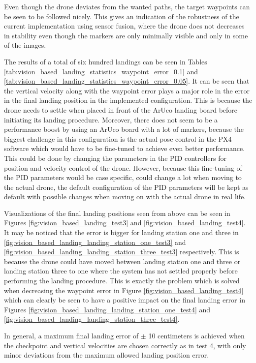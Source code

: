 \documentclass[../Head/report.tex]{subfiles}
\begin{document}
Even though the drone deviates from the wanted paths, the target waypoints can be seen to be followed nicely. This gives an indication of the robustness of the current implementation using sensor fusion, where the drone does not decreases in stability even though the markers are only minimally visible and only in some of the images. 

The results of a total of six hundred landings can be seen in Tables \ref{tab:vision_based_landing_statistics_waypoint_error_0.1} and \ref{tab:vision_based_landing_statistics_waypoint_error_0.05}. It can be seen that the vertical velocity along with the waypoint error plays a major role in the error in the final landing position in the implemented configuration. This is because the drone needs to settle when placed in front of the ArUco landing board before initiating its landing procedure. Moreover, there does not seem to be a performance boost by using an ArUco board with a lot of markers, because the biggest challenge in this configuration is the actual pose control in the PX4 software which would have to be fine-tuned to achieve even better performance. This could be done by changing the parameters in the PID controllers for position and velocity control of the drone. However, because this fine-tuning of the PID parameters would be case specific, could change a lot when moving to the actual drone, the default configuration of the PID parameters will be kept as default with possible changes when moving on with the actual drone in real life. 

Visualizations of the final landing positions seen from above can be seen in Figures \ref{fig:vision_based_landing_test3} and \ref{fig:vision_based_landing_test4}. It may be noticed that the error is bigger for landing station one and three in \ref{fig:vision_based_landing_landing_station_one_test3} and \ref{fig:vision_based_landing_landing_station_three_test3} respectively. This is because the drone could have moved between landing station one and three or landing station three to one where the system has not settled properly before performing the landing procedure. This is exactly the problem which is solved when decreasing the waypoint error in Figure \ref{fig:vision_based_landing_test4} which can clearly be seen to have a positive impact on the final landing error in Figures \ref{fig:vision_based_landing_landing_station_one_test4} and \ref{fig:vision_based_landing_landing_station_three_test4}.  

In general, a maximum final landing error of $\pm$ 10 centimeters is achieved when the checkpoint and vertical velocities are chosen correctly as in test 4, with only minor deviations from the maximum allowed landing position error. 
\end{document}
